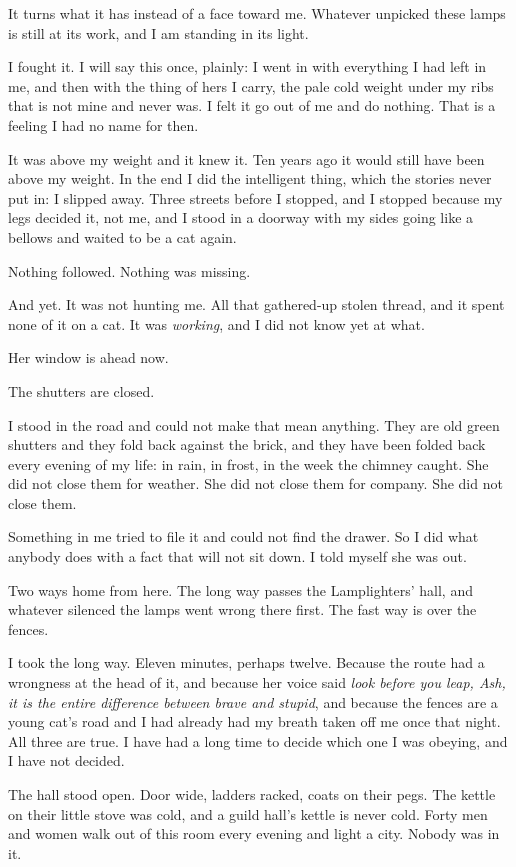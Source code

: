 It turns what it has instead of a face toward me. Whatever unpicked these lamps is still at its work, and I am standing in its light.

I fought it. I will say this once, plainly: I went in with everything I had left in me, and then with the thing of hers I carry, the pale cold weight under my ribs that is not mine and never was. I felt it go out of me and do nothing. That is a feeling I had no name for then.

It was above my weight and it knew it. Ten years ago it would still have been above my weight. In the end I did the intelligent thing, which the stories never put in: I slipped away. Three streets before I stopped, and I stopped because my legs decided it, not me, and I stood in a doorway with my sides going like a bellows and waited to be a cat again.

Nothing followed. Nothing was missing.

And yet. It was not hunting me. All that gathered-up stolen thread, and it spent none of it on a cat. It was \emph{working}, and I did not know yet at what.

\scenebreak

Her window is ahead now.

The shutters are closed.

I stood in the road and could not make that mean anything. They are old green shutters and they fold back against the brick, and they have been folded back every evening of my life: in rain, in frost, in the week the chimney caught. She did not close them for weather. She did not close them for company. She did not close them.

Something in me tried to file it and could not find the drawer. So I did what anybody does with a fact that will not sit down. I told myself she was out.

Two ways home from here. The long way passes the Lamplighters' hall, and whatever silenced the lamps went wrong there first. The fast way is over the fences.

I took the long way. Eleven minutes, perhaps twelve. Because the route had a wrongness at the head of it, and because her voice said \emph{look before you leap, Ash, it is the entire difference between brave and stupid}, and because the fences are a young cat's road and I had already had my breath taken off me once that night. All three are true. I have had a long time to decide which one I was obeying, and I have not decided.

The hall stood open. Door wide, ladders racked, coats on their pegs. The kettle on their little stove was cold, and a guild hall's kettle is never cold. Forty men and women walk out of this room every evening and light a city. Nobody was in it.

